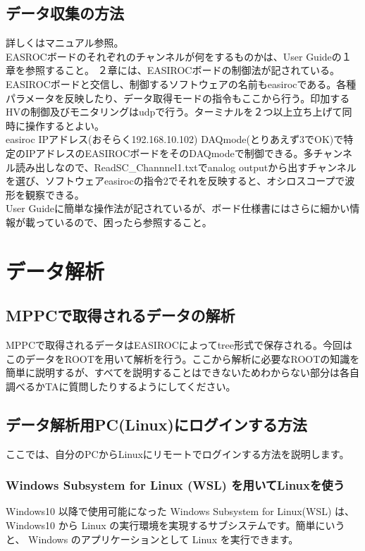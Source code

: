 \documentclass[10pt]{ujarticle}
\begin{document}
\subsection{データ収集の方法}
詳しくはマニュアル参照。\\
EASROCボードのそれぞれのチャンネルが何をするものかは、User Guideの１章を参照すること。
２章には、EASIROCボードの制御法が記されている。EASIROCボードと交信し、制御するソフトウェアの名前もeasirocである。各種パラメータを反映したり、データ取得モードの指令もここから行う。印加するHVの制御及びモニタリングはudpで行う。ターミナルを２つ以上立ち上げて同時に操作するとよい。\\
easiroc IPアドレス(おそらく192.168.10.102) DAQmode(とりあえず3でOK)で特定のIPアドレスのEASIROCボードをそのDAQmodeで制御できる。多チャンネル読み出しなので、ReadSC\_Channnel1.txtでanalog outputから出すチャンネルを選び、ソフトウェアeasirocの指令2でそれを反映すると、オシロスコープで波形を観察できる。\\
User Guideに簡単な操作法が記されているが、ボード仕様書にはさらに細かい情報が載っているので、困ったら参照すること。

\section{データ解析}
\subsection{MPPCで取得されるデータの解析}
MPPCで取得されるデータはEASIROCによってtree形式で保存される。今回はこのデータをROOTを用いて解析を行う。ここから解析に必要なROOTの知識を簡単に説明するが、すべてを説明することはできないためわからない部分は各自調べるかTAに質問したりするようにしてください。

\subsection{データ解析用PC(Linux)にログインする方法}
ここでは、自分のPCからLinuxにリモートでログインする方法を説明します。

\subsubsection{Windows Subsystem for Linux (WSL) を用いてLinuxを使う}
Windows10 以降で使用可能になった Windows Subsystem for Linux(WSL) は、 Windows10 から Linux の実行環境を実現するサブシステムです。簡単にいうと、 Windows のアプリケーションとして Linux を実行できます。\\
\end{document}
